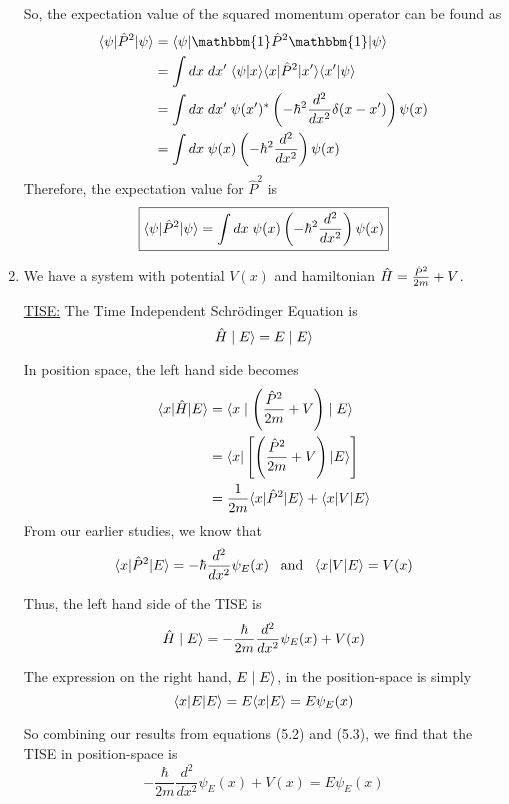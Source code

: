 \documentclass[twoside]{article}
\begin{document}
\begin{enumerate}
   So, the expectation value of the squared momentum operator can be found as 
   \begin{align*}
      \inner{\psi}{\hat{P}^2|\psi} &= \inner{\psi}{\mathbbm{1}\hat{P}^2\mathbbm{1}|\psi} \\
                                   &= \int dx\;dx'\; \inner{\psi}{x} \inner{x}{\hat{P}^2|x'} \inner{x'}{\psi} \\
                                   &= \int dx\;dx'\; \psi(x')^{*} \left( -\hbar^2 \frac{d^2}{dx^2} \delta(x-x') \right) \psi(x) \\ 
                                   &= \int dx\; \psi(x) \left( -\hbar^2 \frac{d^2}{dx^2} \right) \psi(x)
   \end{align*}
   Therefore, the expectation value for $\hat{P}^2$ is 
   \[ \boxed{\langle \psi | \hat{P}^2|\psi \rangle = \int dx\; \psi(x) \left( -\hbar^2 \frac{d^2}{dx^2}  \right) \psi(x)} \]

   \item We have a system with potential $V(x)$ and hamiltonian $\hat{H} = \frac{\hat{P}^2}{2m} + V$.
   
   \underline{TISE:}
   The Time Independent Schrödinger Equation is 
   \[ \hat{H}\mid E\rangle = E\mid E\rangle \]

   In position space, the left hand side becomes 
   \begin{align*}
      \langle x | \hat{H}|E \rangle &= \langle x\mid \left( \frac{\hat{P}^2}{2m} + V \right) \mid E\rangle \\
                        &= \langle x | \left[ \left( \frac{\hat{P}^2}{2m} + V \right) |E \rangle \right] \\
                        &= \frac{1}{2m}\langle x | \hat{P}^2|E \rangle + \langle x | V|E \rangle
   \end{align*}
   From our earlier studies, we know that 
   \[ \langle x | \hat{P}^2|E \rangle = -\hbar \frac{d^2}{dx^2}\psi_E(x)\;\;\;\text{and}\;\;\;\langle x | V|E \rangle = V(x)\]
   
   Thus, the left hand side of the TISE is 
   \begin{equation}
      \hat{H}\mid E\rangle = -\frac{\hbar}{2m} \frac{d^2}{dx^2}\psi_E(x) + V(x) 
   \end{equation}

   The expression on the right hand, $E\mid E\rangle$, in the position-space is simply
   \begin{equation}
      \langle x | E|E \rangle = E\langle x | E \rangle = E\psi_E(x)
   \end{equation}

   So combining our results from equations (5.2) and (5.3), we find that the TISE in position-space is 
   \[ \boxed{-\frac{\hbar}{2m} \frac{d^2}{dx^2}\psi_E(x) + V(x) = E\psi_E(x)} \]


\end{enumerate}
\end{document}
